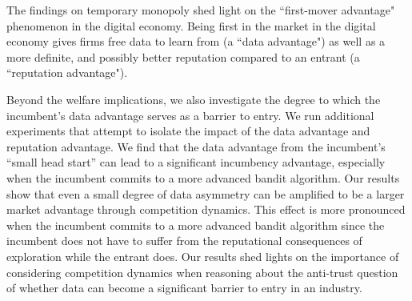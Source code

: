 \documentclass[../competing_bandits_with_appendix.tex]{subfiles}
\begin{document}
The findings on temporary monopoly shed light on the ``first-mover advantage" phenomenon in the digital economy. Being first in the market in the digital economy gives firms free data to learn from (a ``data advantage") as well as a more definite, and possibly better reputation compared to an entrant (a ``reputation advantage").

Beyond the welfare implications, we also investigate the degree to which the incumbent's data advantage serves as a barrier to entry. We run additional experiments that attempt to isolate the impact of the data advantage and reputation advantage. We find that the data advantage from the incumbent's ``small head start'' can lead to a significant incumbency advantage, especially when the incumbent commits to a more advanced bandit algorithm. Our results show that even a small degree of data asymmetry can be amplified to be a larger market advantage through competition dynamics. This effect is more pronounced when the incumbent commits to a more advanced bandit algorithm since the incumbent does not have to suffer from the reputational consequences of exploration while the entrant does. Our results shed lights on the importance of considering competition dynamics when reasoning about the anti-trust question of whether data can become a significant barrier to entry in an industry.

\end{document}
